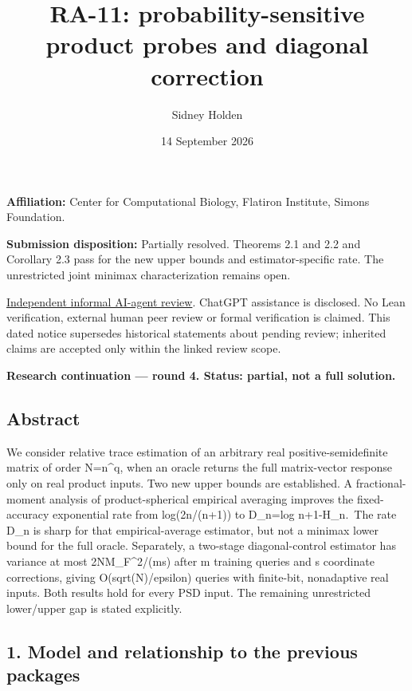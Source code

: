 \documentclass[
  10pt,
]{article}
\title{RA-11: probability-sensitive product probes and diagonal
correction}
\author{Sidney Holden}
\date{14 September 2026}
\begin{document}
\maketitle

\textbf{Affiliation:} Center for Computational Biology, Flatiron
Institute, Simons Foundation.

\textbf{Submission disposition:} Partially resolved. Theorems 2.1 and
2.2 and Corollary 2.3 pass for the new upper bounds and
estimator-specific rate. The unrestricted joint minimax characterization
remains open.

\href{https://github.com/ajt60gaibb/OpenProblemsInNLA/blob/main/reviews/2026-09-14-further-submissions/RA-11-review.md}{Independent
informal AI-agent review}. ChatGPT assistance is disclosed. No Lean
verification, external human peer review or formal verification is
claimed. This dated notice supersedes historical statements about
pending review; inherited claims are accepted only within the linked
review scope.

\textbf{Research continuation --- round 4. Status: partial, not a full
solution.}

\subsection{Abstract}\label{abstract}

We consider relative trace estimation of an arbitrary real
positive-semidefinite matrix of order N=n\^{}q, when an oracle returns
the full matrix-vector response only on real product inputs. Two new
upper bounds are established. A fractional-moment analysis of
product-spherical empirical averaging improves the fixed-accuracy
exponential rate from log(2n/(n+1)) to D\_n=log n+1-H\_n.~The rate D\_n
is sharp for that empirical-average estimator, but not a minimax lower
bound for the full oracle. Separately, a two-stage diagonal-control
estimator has variance at most
2N\textbar\textbar M\textbar\textbar\_F\^{}2/(ms) after m training
queries and s coordinate corrections, giving O(sqrt(N)/epsilon) queries
with finite-bit, nonadaptive real inputs. Both results hold for every
PSD input. The remaining unrestricted lower/upper gap is stated
explicitly.

\subsection{1. Model and relationship to the previous
packages}\label{model-and-relationship-to-the-previous-packages}
\end{document}

